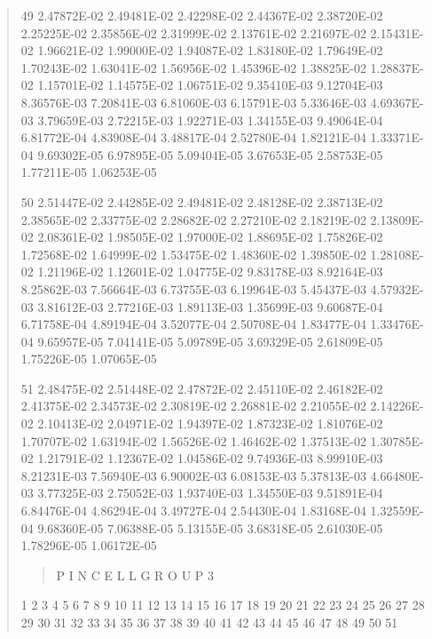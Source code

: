 \documentclass[letterpaper,10pt,english]{sphinxmanual}
\begin{document}
\begin{quote}
\begin{DUlineblock}{0em}
\item[] 49   2.47872E-02  2.49481E-02  2.42298E-02  2.44367E-02  2.38720E-02  2.25225E-02  2.35856E-02  2.31999E-02  2.13761E-02  2.21697E-02  2.15431E-02  1.96621E-02  1.99000E-02  1.94087E-02  1.83180E-02  1.79649E-02  1.70243E-02  1.63041E-02  1.56956E-02  1.45396E-02  1.38825E-02  1.28837E-02  1.15701E-02  1.14575E-02  1.06751E-02  9.35410E-03  9.12704E-03  8.36576E-03  7.20841E-03  6.81060E-03  6.15791E-03  5.33646E-03  4.69367E-03  3.79659E-03  2.72215E-03  1.92271E-03  1.34155E-03  9.49064E-04  6.81772E-04  4.83908E-04  3.48817E-04  2.52780E-04  1.82121E-04  1.33371E-04  9.69302E-05  6.97895E-05  5.09404E-05  3.67653E-05  2.58753E-05  1.77211E-05  1.06253E-05
\item[] 50   2.51447E-02  2.44285E-02  2.49481E-02  2.48128E-02  2.38713E-02  2.38565E-02  2.33775E-02  2.28682E-02  2.27210E-02  2.18219E-02  2.13809E-02  2.08361E-02  1.98505E-02  1.97000E-02  1.88695E-02  1.75826E-02  1.72568E-02  1.64999E-02  1.53475E-02  1.48360E-02  1.39850E-02  1.28108E-02  1.21196E-02  1.12601E-02  1.04775E-02  9.83178E-03  8.92164E-03  8.25862E-03  7.56664E-03  6.73755E-03  6.19964E-03  5.45437E-03  4.57932E-03  3.81612E-03  2.77216E-03  1.89113E-03  1.35699E-03  9.60687E-04  6.71758E-04  4.89194E-04  3.52077E-04  2.50708E-04  1.83477E-04  1.33476E-04  9.65957E-05  7.04141E-05  5.09789E-05  3.69329E-05  2.61809E-05  1.75226E-05  1.07065E-05
\item[] 51   2.48475E-02  2.51448E-02  2.47872E-02  2.45110E-02  2.46182E-02  2.41375E-02  2.34573E-02  2.30819E-02  2.26881E-02  2.21055E-02  2.14226E-02  2.10413E-02  2.04971E-02  1.94397E-02  1.87323E-02  1.81076E-02  1.70707E-02  1.63194E-02  1.56526E-02  1.46462E-02  1.37513E-02  1.30785E-02  1.21791E-02  1.12367E-02  1.04586E-02  9.74936E-03  8.99910E-03  8.21231E-03  7.56940E-03  6.90002E-03  6.08153E-03  5.37813E-03  4.66480E-03  3.77325E-03  2.75052E-03  1.93740E-03  1.34550E-03  9.51891E-04  6.84476E-04  4.86294E-04  3.49727E-04  2.54430E-04  1.83168E-04  1.32559E-04  9.68360E-05  7.06388E-05  5.13155E-05  3.68318E-05  2.61030E-05  1.78296E-05  1.06172E-05
\end{DUlineblock}
\begin{quote}

P I N  C E L L       G R O U P 3
\end{quote}

\begin{DUlineblock}{0em}
\item[] 1        2        3        4        5        6        7        8        9           10           11           12           13           14           15           16           17           18           19           20           21           22           23           24           25           26           27           28           29           30           31           32           33           34           35           36           37           38           39           40           41           42           43           44           45           46           47           48           49           50           51
\end{DUlineblock}


\end{quote}
\end{document}
